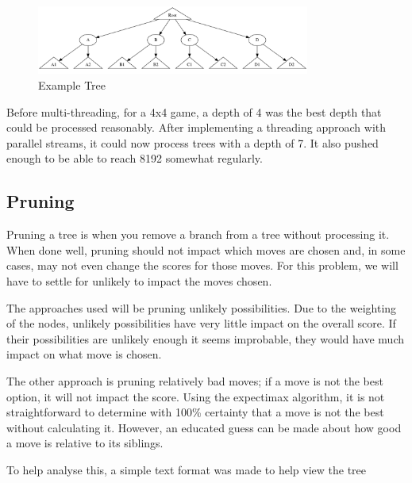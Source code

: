 \documentclass{article}
\begin{document}
\begin{figure}
    \centering
    \includegraphics[width=0.8\textwidth]{tree.png}
    \caption{Example Tree}
    \label{fig:threadtree}
\end{figure}

Before multi-threading, for a 4x4 game, a depth of 4 was the best depth that could be processed reasonably. After implementing a threading approach with parallel streams, it could now process trees with a depth of 7. It also pushed enough to be able to reach 8192 somewhat regularly.

\subsection{Pruning}
Pruning a tree is when you remove a branch from a tree without processing it. When done well, pruning should not impact which moves are chosen and, in some cases, may not even change the scores for those moves. For this problem, we will have to settle for unlikely to impact the moves chosen. 

The approaches used will be pruning unlikely possibilities. Due to the weighting of the nodes, unlikely possibilities have very little impact on the overall score. If their possibilities are unlikely enough it seems improbable, they would have much impact on what move is chosen. 

The other approach is pruning relatively bad moves; if a move is not the best option, it will not impact the score. Using the expectimax algorithm, it is not straightforward to determine with 100\% certainty that a move is not the best without calculating it. However, an educated guess can be made about how good a move is relative to its siblings.

To help analyse this, a simple text format was made to help view the tree
\end{document}
